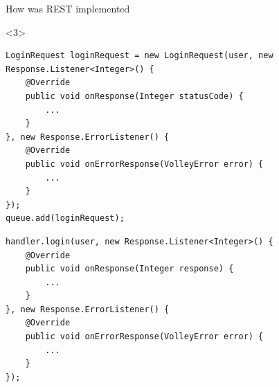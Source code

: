 \begin{frame}[fragile]{How was REST implemented}
\begin{onlyenv}<3>
\begin{center}
\begin{minipage}[H]{0.9\linewidth}
\begin{lstlisting}
LoginRequest loginRequest = new LoginRequest(user, new Response.Listener<Integer>() {
	@Override
    public void onResponse(Integer statusCode) {
    	...            
    }            
}, new Response.ErrorListener() {
    @Override
    public void onErrorResponse(VolleyError error) {
    	...
    }
});
queue.add(loginRequest);
\end{lstlisting} 
\begin{lstlisting}    
handler.login(user, new Response.Listener<Integer>() {
	@Override
    public void onResponse(Integer response) {
    	...
    }
}, new Response.ErrorListener() {
    @Override
    public void onErrorResponse(VolleyError error) {
    	... 
    }
});
\end{lstlisting} 
\end{minipage}
\end{center}
\end{onlyenv}
\end{frame}

